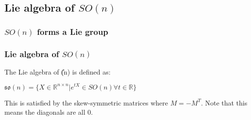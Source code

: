 \subsection{Lie algebra of \(SO(n)\)}

\subsubsection{\(SO(n)\) forms a Lie group}

\subsubsection{Lie algebra of \(SO(n)\)}

The Lie algebra of \U(n)\) is defined as:

\(\mathfrak{so}(n)=\{X\in \mathbb {R}^{n\times n}|e^{tX}\in SO(n) \forall t\in \mathbb{R}\}\)

This is satisfied by the skew-symmetric matrices where \(M=-M^T\). Note that this means the diagonals are all \(0\).

